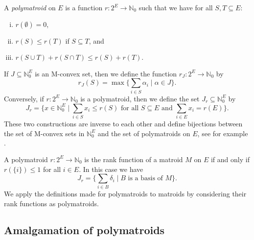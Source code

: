 \documentclass[11pt]{article}
\theoremstyle{definition}
\numberwithin{equation}{section}
\newcommand{\N}{{\mathbb N}}
\begin{document}
\begin{Def}
    A \emph{polymatroid} on $E$ is a function $r\colon 2^E\to\N_0$ such that we have for all $S,T\subseteq E$:
            \begin{enumerate}[(i)]
            \item $r(\emptyset)=0$,
                \item $r(S)\leq r(T)$ if $S\subseteq T$, and
                \item $r(S\cup T)+r(S\cap T)\leq r(S)+r(T)$.
            \end{enumerate}
\end{Def}
If $J\subseteq\N_0^E$ is an M-convex set, then we define the function $r_J\colon2^E\to\N_0$ by
    \begin{equation*}
        r_J(S)=\max\{\sum_{i\in S}\alpha_i\mid \alpha\in J\}.
    \end{equation*}
Conversely, if $r\colon 2^E\to\N_0$ is a polymatroid, then we define the set $J_r\subseteq\N_0^E$ by
\begin{equation*}
    J_r=\{x\in\N_0^E\mid \sum_{i\in S}x_i\leq r(S)\textrm{ for all }S\subseteq E\textrm{ and }\sum_{i\in E}x_i=r(E)\}.
\end{equation*}
These two constructions are inverse to each other and define bijections between the set of M-convex sets in $\N_0^E$ and the set of polymatroids on $E$, see for example \cite[\S4.4]{murota}.

\begin{rem}
    A polymatroid $r\colon 2^E\to\N_0$ is the rank function of a matroid $M$ on $E$ if and only if $r(\{i\})\leq1$ for all $i\in E$. In this case we have
    \begin{equation*}
        J_r=\{\sum_{i\in B}\delta_i\mid B\textrm{ is a basis of }M\}.
    \end{equation*}
    We apply the definitions made for polymatroids to matroids by considering their rank functions as polymatroids.
\end{rem}

\subsection{Amalgamation of polymatroids}
\end{document}
